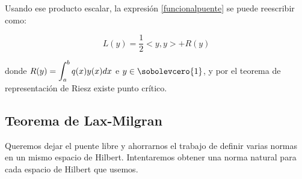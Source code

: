 Usando ese producto escalar, la expresión \eqref{funcionalpuente} se puede reescribir como:

\[
L(y)=\frac{1}{2}<y,y>+R(y)
\]

donde $R(y)=\displaystyle\int_{ a }^{ b } q(x)y(x)dx$ e $y\in\sobolevcero{1}$, y por el teorema de representación de Riesz existe punto crítico.

\subsection{Teorema de Lax-Milgran}

Queremos dejar el puente libre y ahorrarnos el trabajo de definir varias normas en un mismo espacio de Hilbert. Intentaremos obtener una norma natural para cada espacio de Hilbert que usemos.